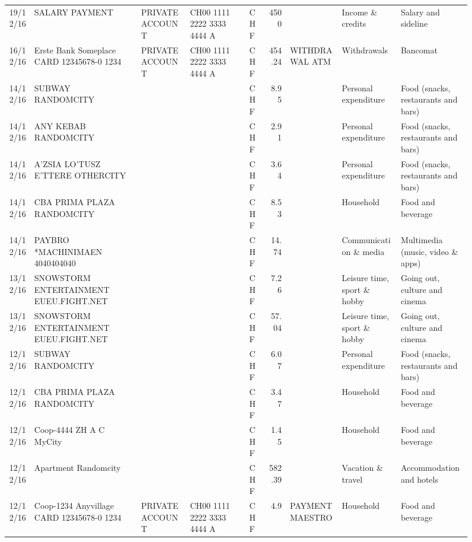 \begin{landscape}
\begin{sidewaysfigure}
\begin{table}[h]
\begin{center}
\begin{tabular}{rllllrlll}
		19/12/16 & SALARY PAYMENT & PRIVATE ACCOUNT & CH00 1111 2222 3333 4444 A & CHF   & 4500  &       & Income \& credits & Salary and sideline \\
		16/12/16 & Erste Bank Someplace CARD 12345678-0 1234 & PRIVATE ACCOUNT & CH00 1111 2222 3333 4444 A & CHF   & 454.24 & WITHDRAWAL ATM & Withdrawals & Bancomat \\
		14/12/16 & SUBWAY                   RANDOMCITY &       &       & CHF   & 8.95  &       & Personal expenditure & Food (snacks, restaurants and bars) \\
		14/12/16 & ANY KEBAB            RANDOMCITY &       &       & CHF   & 2.91  &       & Personal expenditure & Food (snacks, restaurants and bars) \\
		14/12/16 & A'ZSIA LO'TUSZ E'TTERE   OTHERCITY &       &       & CHF   & 3.64  &       & Personal expenditure & Food (snacks, restaurants and bars) \\
		14/12/16 & CBA PRIMA PLAZA        RANDOMCITY &       &       & CHF   & 8.53  &       & Household & Food and beverage \\
		14/12/16 & PAYBRO *MACHINIMAEN      4040404040 &       &       & CHF   & 14.74 &       & Communication \& media & Multimedia (music, video \& apps) \\
		13/12/16 & SNOWSTORM ENTERTAINMENT EUEU.FIGHT.NET &       &       & CHF   & 7.26  &       & Leisure time, sport \& hobby & Going out, culture and cinema \\
		13/12/16 & SNOWSTORM ENTERTAINMENT EUEU.FIGHT.NET &       &       & CHF   & 57.04 &       & Leisure time, sport \& hobby & Going out, culture and cinema \\
		12/12/16 & SUBWAY                   RANDOMCITY &       &       & CHF   & 6.07  &       & Personal expenditure & Food (snacks, restaurants and bars) \\
		12/12/16 & CBA PRIMA PLAZA        RANDOMCITY &       &       & CHF   & 3.47  &       & Household & Food and beverage \\
		12/12/16 & Coop-4444 ZH A C   MyCity &       &       & CHF   & 1.45  &       & Household & Food and beverage \\
		12/12/16 & Apartment               Randomcity &       &       & CHF   & 582.39 &       & Vacation \& travel & Accommodation and hotels \\
		12/12/16 & Coop-1234 Anyvillage CARD 12345678-0 1234 & PRIVATE ACCOUNT & CH00 1111 2222 3333 4444 A & CHF   & 4.9   & PAYMENT MAESTRO & Household & Food and beverage \\

\end{tabular}
\end{center}
\end{table}
\end{sidewaysfigure}
\end{landscape}
